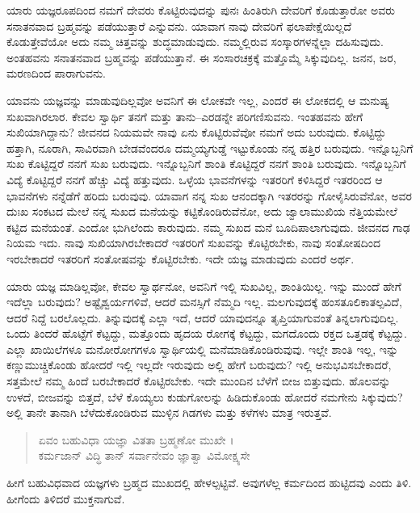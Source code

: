 ಯಾರು ಯಜ್ಞರೂಪದಿಂದ ನಮಗೆ ದೇವರು ಕೊಟ್ಟಿರುವುದನ್ನು ಪುನಃ ಹಿಂತಿರುಗಿ ದೇವರಿಗೆ ಕೊಡುತ್ತಾರೋ ಅವರು ಸನಾತನವಾದ ಬ್ರಹ್ಮವನ್ನು ಪಡೆಯುತ್ತಾರೆ ಎನ್ನುವನು. ಯಾವಾಗ ನಾವು ದೇವರಿಗೆ ಫಲಾಪೇಕ್ಷೆಯಿಲ್ಲದೆ ಕೊಡುತ್ತೇವೆಯೋ ಅದು ನಮ್ಮ ಚಿತ್ತವನ್ನು ಶುದ್ಧಮಾಡುವುದು. ನಮ್ಮಲ್ಲಿರುವ ಸಂಸ್ಕಾರಗಳನ್ನೆಲ್ಲಾ ದಹಿಸುವುದು. ಅಂತಹವನು ಸನಾತನವಾದ ಬ್ರಹ್ಮವನ್ನು ಪಡೆಯುತ್ತಾನೆ. ಈ ಸಂಸಾರಚಕ್ರಕ್ಕೆ ಮತ್ತೊಮ್ಮೆ ಸಿಕ್ಕುವುದಿಲ್ಲ. ಜನನ, ಜರ, ಮರಣದಿಂದ ಪಾರಾಗುವನು.

ಯಾವನು ಯಜ್ಞವನ್ನು ಮಾಡುವುದಿಲ್ಲವೋ ಅವನಿಗೆ ಈ ಲೋಕವೇ ಇಲ್ಲ, ಎಂದರೆ ಈ ಲೋಕದಲ್ಲಿ ಆ ಮನುಷ್ಯ ಸುಖವಾಗಿರಲಾರ. ಕೇವಲ ಸ್ವಾರ್ಥಿ ತನಗೆ ಮತ್ತು ತಾನು–ಎರಡನ್ನೇ ಪರಿಗಣಿಸುವನು. ಇಂತಹವನು ಹೇಗೆ ಸುಖಿಯಾಗಿದ್ದಾನು? ಜೀವನದ ನಿಯಮವೇ ನಾವು ಏನು ಕೊಟ್ಟಿರುವೆವೋ ನಮಗೆ ಅದು ಬರುವುದು. ಕೊಟ್ಟಿದ್ದು ಹತ್ತಾಗಿ, ನೂರಾಗಿ, ಸಾವಿರವಾಗಿ ಬೇಡವೆಂದರೂ ದಮ್ಮಯ್ಯಗುಡ್ಡೆ ಇಟ್ಟುಕೊಂಡು ನನ್ನ ಹತ್ತಿರ ಬರುವುದು. ಇನ್ನೊಬ್ಬನಿಗೆ ಸುಖ ಕೊಟ್ಟಿದ್ದರೆ ನನಗೆ ಸುಖ ಬರುವುದು. ಇನ್ನೊಬ್ಬನಿಗೆ ಶಾಂತಿ ಕೊಟ್ಟಿದ್ದರೆ ನನಗೆ ಶಾಂತಿ ಬರುವುದು. ಇನ್ನೊಬ್ಬನಿಗೆ ವಿದ್ಯೆ ಕೊಟ್ಟಿದ್ದರೆ ನನಗೆ ಹೆಚ್ಚು ವಿದ್ಯೆ ಹತ್ತುವುದು. ಒಳ್ಳೆಯ ಭಾವನೆಗಳನ್ನು ಇತರರಿಗೆ ಕಳಿಸಿದ್ದರೆ ಇತರರಿಂದ ಆ ಭಾವನೆಗಳು ನನ್ನೆಡೆಗೆ ಹರಿದು ಬರುವುವು. ಯಾವಾಗ ನನ್ನ ಸುಖ ಆನಂದಕ್ಕಾಗಿ ಇತರರನ್ನು ಗೋಳೈಸಿರುವೆನೋ, ಅವರ ದುಃಖ ಸಂಕಟದ ಮೇಲೆ ನನ್ನ ಸುಖದ ಮನೆಯನ್ನು ಕಟ್ಟಿಕೊಂಡಿರುವೆನೋ, ಅದು ಜ್ವಾಲಾಮುಖಿಯ ನೆತ್ತಿಯಮೇಲೆ ಕಟ್ಟಿದ ಮನೆಯಂತೆ. ಎಂದೋ ಭುಗಿಲೆಂದು ಕಾರುವುದು. ನಮ್ಮ ಸುಖದ ಮನೆ ಬೂದಿಪಾಲಾಗುವುದು. ಜೀವನದ ಗಾಢ ನಿಯಮ ಇದು. ನಾವು ಸುಖಿಯಾಗಿರಬೇಕಾದರೆ ಇತರರಿಗೆ ಸುಖವನ್ನು ಕೊಟ್ಟಿರಬೇಕು, ನಾವು ಸಂತೋಷದಿಂದ ಇರಬೇಕಾದರೆ ಇತರರಿಗೆ ಸಂತೋಷವನ್ನು ಕೊಟ್ಟಿರಬೇಕು. ಇದೇ ಯಜ್ಞ ಮಾಡುವುದು ಎಂದರೆ ಅರ್ಥ.

ಯಾರು ಯಜ್ಞ ಮಾಡಿಲ್ಲವೋ, ಕೇವಲ ಸ್ವಾರ್ಥನೋ, ಅವನಿಗೆ ಇಲ್ಲಿ ಸುಖವಿಲ್ಲ, ಶಾಂತಿಯಿಲ್ಲ. ಇನ್ನು ಮುಂದೆ ಹೇಗೆ ಇದೆಲ್ಲಾ ಬರುವುದು? ಅಷ್ಟೈಶ್ವರ್ಯಗಳಿವೆ, ಆದರೆ ಮನಸ್ಸಿಗೆ ನೆಮ್ಮದಿ ಇಲ್ಲ. ಮಲಗುವುದಕ್ಕೆ ಹಂಸತೂಲಿಕಾತಲ್ಪವಿದೆ, ಆದರೆ ನಿದ್ದೆ ಬರಲೊಲ್ಲದು. ತಿನ್ನುವುದಕ್ಕೆ ಎಲ್ಲಾ ಇದೆ, ಆದರೆ ಯಾವುದನ್ನೂ ತೃಪ್ತಿಯಾಗುವಂತೆ ತಿನ್ನಲಾಗುವುದಿಲ್ಲ. ಒಂದು ತಿಂದರೆ ಹೊಟ್ಟೆಗೆ ಕೆಟ್ಟದ್ದು, ಮತ್ತೊಂದು ಹೃದಯ ರೋಗಕ್ಕೆ ಕೆಟ್ಟದ್ದು, ಮಗದೊಂದು ರಕ್ತದ ಒತ್ತಡಕ್ಕೆ ಕೆಟ್ಟದ್ದು. ಎಲ್ಲಾ ಖಾಯಿಲೆಗಳೂ ಮನೋರೋಗಗಳೂ ಸ್ವಾರ್ಥಿಯಲ್ಲಿ ಮನೆಮಾಡಿಕೊಂಡಿರುವುವು. ಇಲ್ಲೇ ಶಾಂತಿ ಇಲ್ಲ, ಇನ್ನು ಕಣ್ಣುಮುಚ್ಚಿಕೊಂಡು ಹೋದರೆ ಇಲ್ಲಿ ಇಲ್ಲದೇ ಇರುವುದು ಅಲ್ಲಿ ಹೇಗೆ ಬರುವುದು? ಇಲ್ಲಿ ಅನುಭವಿಸಬೇಕಾದರೆ, ಸತ್ತಮೇಲೆ ನಮ್ಮ ಹಿಂದೆ ಬರಬೇಕಾದರೆ ಕೊಟ್ಟಿರಬೇಕು. ಇದೇ ಮುಂದಿನ ಬೆಳೆಗೆ ಬೀಜ ಬಿತ್ತುವುದು. ಹೊಲವನ್ನು ಉಳದೆ, ಬೀಜವನ್ನು ಬಿತ್ತದೆ, ಬೆಳೆ ಕೊಯ್ಯಲು ಕುಡುಗೋಲನ್ನು ಹಿಡಿದುಕೊಂಡು ಹೋದರೆ ನಮಗೇನು ಸಿಕ್ಕುವುದು? ಅಲ್ಲಿ ತಾನೇ ತಾನಾಗಿ ಬೆಳೆದುಕೊಂಡಿರುವ ಮುಳ್ಳಿನ ಗಿಡಗಳು ಮತ್ತು ಕಳೆಗಳು ಮಾತ್ರ ಇರುತ್ತವೆ.

\begin{verse}
ಏವಂ ಬಹುವಿಧಾ ಯಜ್ಞಾ ವಿತತಾ ಬ್ರಹ್ಮಣೋ ಮುಖೇ ।\\ಕರ್ಮಜಾನ್ ವಿದ್ಧಿ ತಾನ್ ಸರ್ವಾನೇವಂ ಜ್ಞಾತ್ವಾ ವಿಮೋಕ್ಷ್ಯಸೇ 
\end{verse}

{\small ಹೀಗೆ ಬಹುವಿಧವಾದ ಯಜ್ಞಗಳು ಬ್ರಹ್ಮದ ಮುಖದಲ್ಲಿ ಹೇಳಲ್ಪಟ್ಟಿವೆ. ಅವುಗಳೆಲ್ಲ ಕರ್ಮದಿಂದ ಹುಟ್ಟಿದವು ಎಂದು ತಿಳಿ. ಹೀಗೆಂದು ತಿಳಿದರೆ ಮುಕ್ತನಾಗುವೆ.}

